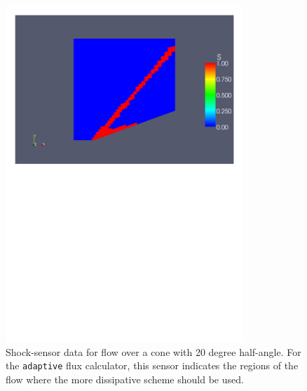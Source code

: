 \begin{figure}[htbp]
\begin{center}
\includegraphics[width=0.8\textwidth, viewport=24 447 571 819]{../2D/cone20-simple/cone20_S.pdf}
\end{center}
\caption{Shock-sensor data for flow over a cone with 20 degree half-angle.
         For the \texttt{adaptive} flux calculator, 
	 this sensor indicates the regions
	 of the flow where the more dissipative scheme should be used.}
\label{cone20-shock-sensor-fig}
\end{figure}

